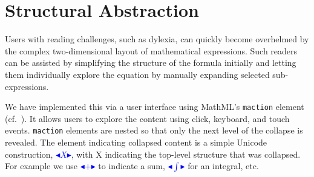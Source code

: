 \documentclass[conference]{IEEEtran}
\def\collapse#1{\textcolor{blue}{\ensuremath{\mathord{\blacktriangleleft}
\mathord{#1}
\mathord{\blacktriangleright}}}}
\begin{document}
\section{Structural Abstraction}
\label{sec:abstraction}

Users with reading challenges, such as dylexia, can quickly become 
overhelmed by the complex two-dimensional layout of mathematical 
expressions. Such readers can be assisted by simplifying the structure of
the formula initially and letting them individually explore the equation by
manually expanding selected sub-expressions.

We have implemented this via a user interface using MathML's \texttt{maction}
element (cf.~\cite[3.7.1]{MathML3}). It allows users to explore the content using
click, keyboard, and touch events. \texttt{maction} elements are nested so
that only the next level of the collapse is revealed.
The element indicating collapsed content is a simple Unicode
construction, \collapse{X}, with X indicating the top-level structure that was
collapsed. For example we use \collapse{+} to indicate a sum,
\collapse{\mathrm{\int}} for an integral, etc.
\end{document}
